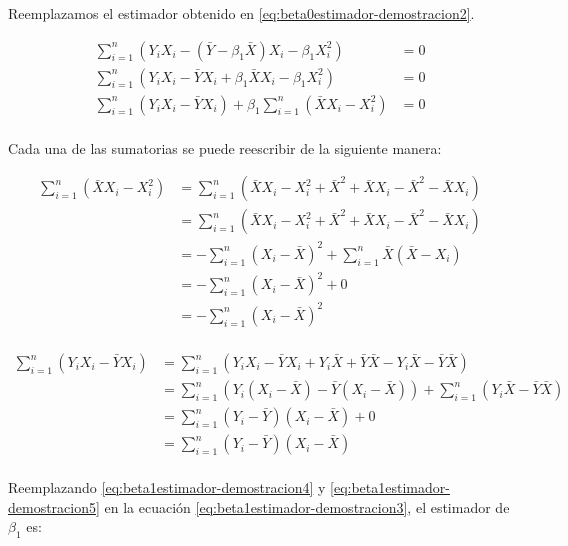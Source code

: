\documentclass[
  11pt,
]{book}
\theoremstyle{definition}
\theoremstyle{definition}
\theoremstyle{definition}
\theoremstyle{definition}
\theoremstyle{remark}
\begin{document}
Reemplazamos el estimador obtenido en \eqref{eq:beta0estimador-demostracion2}.

\begin{equation}
\begin{split}
\sum_{i=1}^n (Y_iX_i - (\bar{Y} - \beta_1\bar{X})X_i - \beta_1X_i^2) &= 0\\
\sum_{i=1}^n (Y_iX_i - \bar{Y}X_i + \beta_1\bar{X}X_i - \beta_1X_i^2) &= 0\\
\sum_{i=1}^n (Y_iX_i - \bar{Y}X_i) + \beta_1\sum_{i=1}^n(\bar{X}X_i - X_i^2) &= 0\\
\end{split}
\label{eq:beta1estimador-demostracion3}
\end{equation}

Cada una de las sumatorias se puede reescribir de la siguiente manera:

\begin{equation}
\begin{split}
\sum_{i=1}^n(\bar{X}X_i - X_i^2) &= \sum_{i=1}^n(\bar{X}X_i - X_i^2 + \bar{X}^2 + \bar{X}X_i - \bar{X}^2 - \bar{X}X_i)\\
&= \sum_{i=1}^n(\bar{X}X_i - X_i^2 + \bar{X}^2 + \bar{X}X_i - \bar{X}^2 - \bar{X}X_i)\\
&= -\sum_{i=1}^n(X_i -\bar{X})^2 + \sum_{i=1}^n\bar{X}(\bar{X}-X_i)\\
&= -\sum_{i=1}^n(X_i -\bar{X})^2 + 0\\
&= -\sum_{i=1}^n(X_i -\bar{X})^2\\
\end{split}
\label{eq:beta1estimador-demostracion4}
\end{equation}

\begin{equation}
\begin{split}
\sum_{i=1}^n (Y_iX_i - \bar{Y}X_i) &= \sum_{i=1}^n (Y_iX_i - \bar{Y}X_i + Y_i\bar{X} + \bar{Y}\bar{X} - Y_i\bar{X} - \bar{Y}\bar{X})\\
&= \sum_{i=1}^n (Y_i(X_i - \bar{X}) - \bar{Y}(X_i - \bar{X})) + \sum_{i=1}^n(Y_i\bar{X} - \bar{Y}\bar{X}) \\
&= \sum_{i=1}^n (Y_i - \bar{Y})(X_i - \bar{X}) + 0 \\
&= \sum_{i=1}^n (Y_i - \bar{Y})(X_i - \bar{X})\\
\end{split}
\label{eq:beta1estimador-demostracion5}
\end{equation}

Reemplazando \eqref{eq:beta1estimador-demostracion4} y \eqref{eq:beta1estimador-demostracion5} en la ecuación \eqref{eq:beta1estimador-demostracion3}, el estimador de \(\beta_1\) es:
\end{document}
